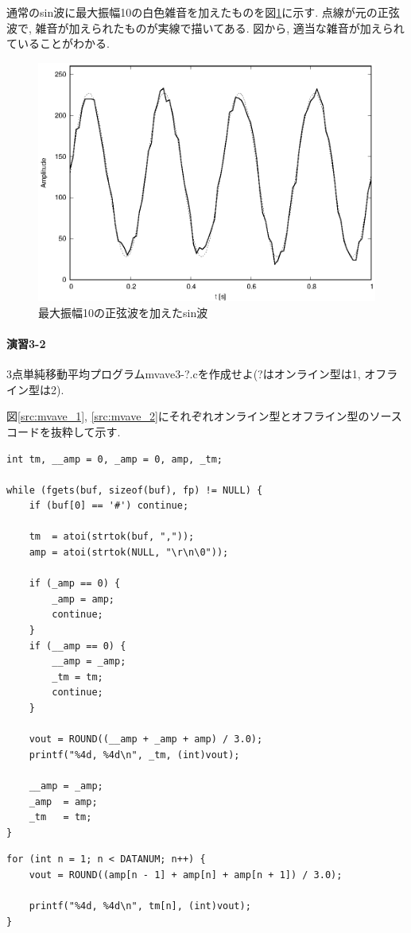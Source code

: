 \documentclass[titlepage]{jsarticle}
\begin{document}
        通常のsin波に最大振幅10の白色雑音を加えたものを図\ref{fig:sin_wn}に示す.
        点線が元の正弦波で, 雑音が加えられたものが実線で描いてある.
        図から, 適当な雑音が加えられていることがわかる.

        \begin{figure}[ht]
            \centering
            \includegraphics[width=12cm]{images/sin_wn.eps}
            \caption{最大振幅10の正弦波を加えたsin波}
            \label{fig:sin_wn}
        \end{figure}

    \paragraph{演習3-2} 3点単純移動平均プログラムmvave3-?.cを作成せよ(?はオンライン型は1,
    オフライン型は2).

        図\ref{src:mvave_1}, \ref{src:mvave_2}にそれぞれオンライン型とオフライン型のソースコードを抜粋して示す.

        \begin{lstlisting}[caption=mvave3-1.c, label=src:mvave_1]
int tm, __amp = 0, _amp = 0, amp, _tm;

while (fgets(buf, sizeof(buf), fp) != NULL) {
    if (buf[0] == '#') continue;
    
    tm  = atoi(strtok(buf, ","));
    amp = atoi(strtok(NULL, "\r\n\0"));

    if (_amp == 0) {
        _amp = amp;
        continue;
    }
    if (__amp == 0) {
        __amp = _amp;
        _tm = tm;
        continue;
    }

    vout = ROUND((__amp + _amp + amp) / 3.0);
    printf("%4d, %4d\n", _tm, (int)vout);

    __amp = _amp;
    _amp  = amp;
    _tm   = tm;
}
        \end{lstlisting}
        \begin{lstlisting}[caption=mvave3-2.c, label=src:mvave_2]
for (int n = 1; n < DATANUM; n++) {
    vout = ROUND((amp[n - 1] + amp[n] + amp[n + 1]) / 3.0);

    printf("%4d, %4d\n", tm[n], (int)vout);
}
        \end{lstlisting}
\end{document}
